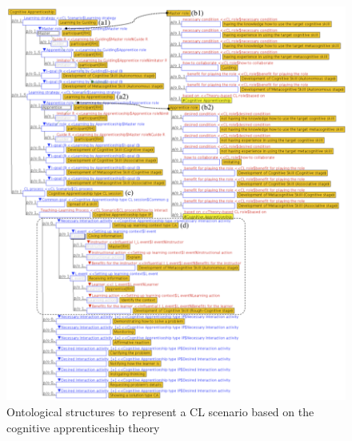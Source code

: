 \begin{figure}[!htbp]
 \caption{Ontological structures to represent a CL scenario based on the cognitive apprenticeship theory}
 \label{fig:cognitive-apprenticeship-ontological-structure}
 \centering
 \includegraphics[width=1\textwidth]{images/chap-ontogacles1/cognitive-apprenticeship-ontological-structure.png}
 \fautor
\end{figure}

